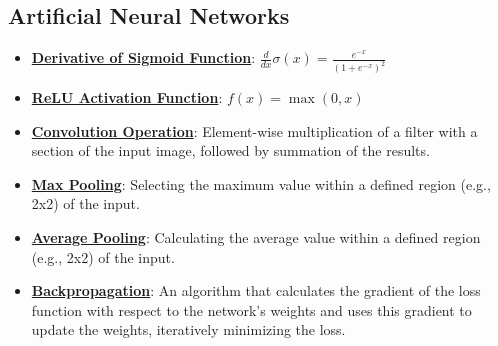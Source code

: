 \documentclass{article}%
\begin{document}
\subsection{Artificial Neural Networks}%
\label{subsec:ArtificialNeuralNetworks}%
\begin{itemize}[leftmargin=*]%
\item \href{https://purdue.brightspace.com/d2l/common/assets/pdfjs-d2l-dist/1.0.14-legacy/web/viewer.html?file=\%2Fcontent\%2Fenforced\%2F1095467-wl.202510.CS.24300.001\%2F04L1-Linear Algebra Primer.pdf\%3Fou\%3D1095467\&lang=en-us\&container=d2l-fileviewer-rendered-pdf\&fullscreen=d2l-fileviewer-rendered-pdf-dialog\&height=667#page=21}{\textbf{Derivative of Sigmoid Function}}: $\frac{d}{dx} \sigma(x) = \frac{e^{-x}}{(1 + e^{-x})^2}$%
\item \href{https://purdue.brightspace.com/d2l/common/assets/pdfjs-d2l-dist/1.0.14-legacy/web/viewer.html?file=\%2Fcontent\%2Fenforced\%2F1095467-wl.202510.CS.24300.001\%2F09L1-cnn.pdf\%3Fou\%3D1095467\&lang=en-us\&container=d2l-fileviewer-rendered-pdf\&fullscreen=d2l-fileviewer-rendered-pdf-dialog\&height=667#page=13}{\textbf{ReLU Activation Function}}: $f(x) = \max(0, x)$%
\item \href{https://purdue.brightspace.com/d2l/common/assets/pdfjs-d2l-dist/1.0.14-legacy/web/viewer.html?file=\%2Fcontent\%2Fenforced\%2F1095467-wl.202510.CS.24300.001\%2F09L1-cnn.pdf\%3Fou\%3D1095467\&lang=en-us\&container=d2l-fileviewer-rendered-pdf\&fullscreen=d2l-fileviewer-rendered-pdf-dialog\&height=667#page=6}{\textbf{Convolution Operation}}: Element-wise multiplication of a filter with a section of the input image, followed by summation of the results.%
\item \href{https://purdue.brightspace.com/d2l/common/assets/pdfjs-d2l-dist/1.0.14-legacy/web/viewer.html?file=\%2Fcontent\%2Fenforced\%2F1095467-wl.202510.CS.24300.001\%2F09L1-cnn.pdf\%3Fou\%3D1095467\&lang=en-us\&container=d2l-fileviewer-rendered-pdf\&fullscreen=d2l-fileviewer-rendered-pdf-dialog\&height=667#page=14}{\textbf{Max Pooling}}: Selecting the maximum value within a defined region (e.g., 2x2) of the input.%
\item \href{https://purdue.brightspace.com/d2l/common/assets/pdfjs-d2l-dist/1.0.14-legacy/web/viewer.html?file=\%2Fcontent\%2Fenforced\%2F1095467-wl.202510.CS.24300.001\%2F09L1-cnn.pdf\%3Fou\%3D1095467\&lang=en-us\&container=d2l-fileviewer-rendered-pdf\&fullscreen=d2l-fileviewer-rendered-pdf-dialog\&height=667#page=15}{\textbf{Average Pooling}}: Calculating the average value within a defined region (e.g., 2x2) of the input.%
\item \href{https://purdue.brightspace.com/d2l/common/assets/pdfjs-d2l-dist/1.0.14-legacy/web/viewer.html?file=\%2Fcontent\%2Fenforced\%2F1095467-wl.202510.CS.24300.001\%2F09L1-cnn.pdf\%3Fou\%3D1095467\&lang=en-us\&container=d2l-fileviewer-rendered-pdf\&fullscreen=d2l-fileviewer-rendered-pdf-dialog\&height=667#page=16}{\textbf{Backpropagation}}: An algorithm that calculates the gradient of the loss function with respect to the network's weights and uses this gradient to update the weights, iteratively minimizing the loss.%
\end{itemize}
\end{document}
